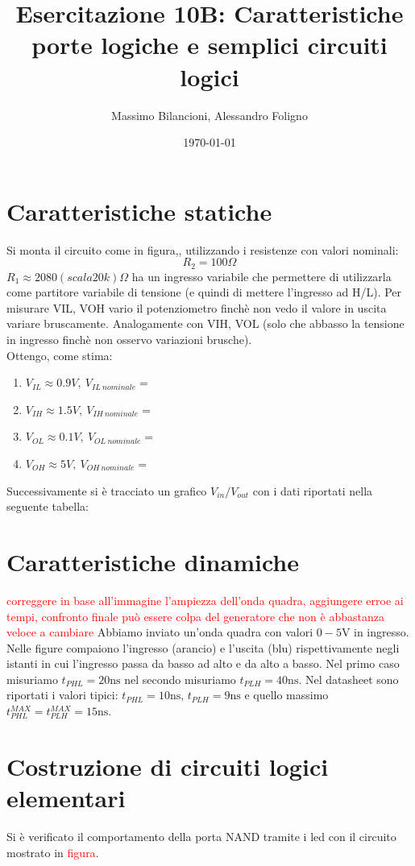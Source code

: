 \documentclass[10pt,a4paper]{article}
\date{\today}
\title{Esercitazione 10B: Caratteristiche porte logiche e semplici circuiti logici}
\author{Massimo Bilancioni, Alessandro Foligno}
\begin{document}
	
\maketitle
	
	\section{Caratteristiche statiche}
	Si monta il circuito come in figura,, utilizzando i resistenze con valori nominali:\[R_2=100\Omega \]
	$R_1\approx2080(scala 20k)\Omega$ ha un ingresso variabile che permettere di utilizzarla come partitore variabile di tensione (e quindi di mettere l'ingresso ad H/L).
	Per misurare VIL, VOH vario il potenziometro finchè non vedo il valore in uscita variare bruscamente. Analogamente con VIH, VOL (solo che abbasso la tensione in ingresso finchè non osservo variazioni brusche).
	\\Ottengo, come stima:
	\begin{enumerate}
		\item $V_{IL}\approx0.9 V,~V_{IL~nominale}=$
		\item $V_{IH}		\approx 1.5V,~V_{IH~nominale}=$
		\item $V_{OL}\approx0.1V,~V_{OL~nominale}=$
		\item $V_{OH}\approx5V,~V_{OH~nominale}=$
	\end{enumerate}
	Successivamente si è tracciato un grafico $V_{in}/V_{out}$ con i dati riportati nella seguente tabella:
	\section{Caratteristiche dinamiche}
\textcolor{red}{correggere in base all'immagine l'ampiezza dell'onda quadra, aggiungere erroe ai tempi, confronto finale può essere colpa del generatore che non è abbastanza veloce a cambiare}
Abbiamo inviato un'onda quadra con valori  $0-5 \si{\volt}$ in ingresso. Nelle figure compaiono l'ingresso (arancio) e l'uscita (blu) rispettivamente negli istanti in cui l'ingresso passa da basso ad alto e da alto a basso.
Nel primo caso misuriamo $t_{PHL}= 20 \si{\nano\second}$ nel secondo  misuriamo $t_{PLH} = 40\si{\nano \second}$.
Nel datasheet sono riportati i valori tipici: $t_{PHL}= 10 \si{\nano\second}$, $t_{PLH} = 9\si{\nano \second}$ e quello massimo $t_{PHL}^{MAX}= t_{PLH}^{MAX}= 15 \si{\nano\second}$.


\section{Costruzione di circuiti logici elementari}
Si è verificato il comportamento della porta NAND tramite i led con il circuito mostrato in \textcolor{red}{figura}.
\end{document}
